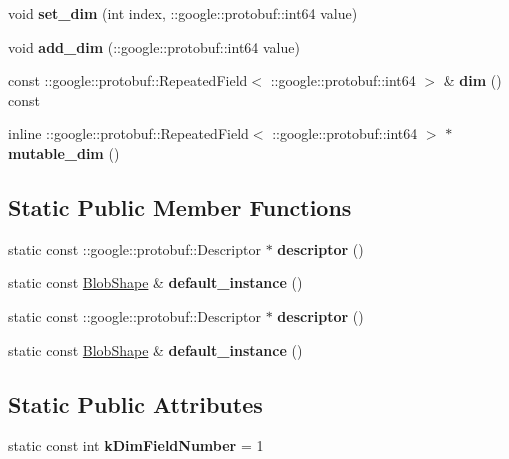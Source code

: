 \begin{DoxyCompactItemize}
void {\bfseries set\+\_\+dim} (int index, \+::google\+::protobuf\+::int64 value)
\item 
\mbox{\label{classcaffe_1_1_blob_shape_ae204db4e08616793e3de02e93e335705}} 
void {\bfseries add\+\_\+dim} (\+::google\+::protobuf\+::int64 value)
\item 
\mbox{\label{classcaffe_1_1_blob_shape_affb21092be5ebe75f86f0c38d98100db}} 
const \+::google\+::protobuf\+::\+Repeated\+Field$<$ \+::google\+::protobuf\+::int64 $>$ \& {\bfseries dim} () const
\item 
\mbox{\label{classcaffe_1_1_blob_shape_a1583d8ee8f9e547c4591d262ecd575dc}} 
inline \+::google\+::protobuf\+::\+Repeated\+Field$<$ \+::google\+::protobuf\+::int64 $>$ $\ast$ {\bfseries mutable\+\_\+dim} ()
\end{DoxyCompactItemize}
\subsection*{Static Public Member Functions}
\begin{DoxyCompactItemize}
\item 
\mbox{\label{classcaffe_1_1_blob_shape_af9a762dacd831ec52e8960ef3b97174c}} 
static const \+::google\+::protobuf\+::\+Descriptor $\ast$ {\bfseries descriptor} ()
\item 
\mbox{\label{classcaffe_1_1_blob_shape_a0127f86acc801b511eef14a6e52717df}} 
static const \mbox{\hyperlink{classcaffe_1_1_blob_shape}{Blob\+Shape}} \& {\bfseries default\+\_\+instance} ()
\item 
\mbox{\label{classcaffe_1_1_blob_shape_a987f8bc539403cdf2c5cb7492c60d338}} 
static const \+::google\+::protobuf\+::\+Descriptor $\ast$ {\bfseries descriptor} ()
\item 
\mbox{\label{classcaffe_1_1_blob_shape_acb7dd364e6fa887e2e30a80b9383cee1}} 
static const \mbox{\hyperlink{classcaffe_1_1_blob_shape}{Blob\+Shape}} \& {\bfseries default\+\_\+instance} ()
\end{DoxyCompactItemize}
\subsection*{Static Public Attributes}
\begin{DoxyCompactItemize}
\item 
\mbox{\label{classcaffe_1_1_blob_shape_ac9428c45842ebad7ad6c8174b3284045}} 
static const int {\bfseries k\+Dim\+Field\+Number} = 1
\end{DoxyCompactItemize}
